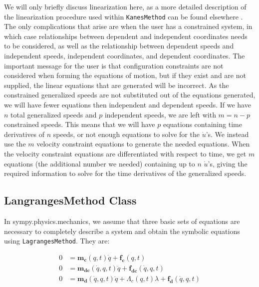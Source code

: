 \documentclass[twocolumn,10pt]{asme2e}
\begin{document}
We will only briefly discuss linearization here, as a more detailed description
of the linearization procedure used within \verb|KanesMethod| can be found
elsewhere \cite{Peterson2013}.  The only complications that arise are when the
user has a constrained system, in which case relationships between dependent
and independent coordinates needs to be considered, as well as the relationship
between dependent speeds and independent speeds, independent coordinates, and
dependent coordinates.  The important message for the user is that
configuration constraints are not considered when forming the equations of
motion, but if they exist and are not supplied, the linear equations that are
generated will be incorrect.
As the constrained generalized speeds are not substituted out of the equations
generated, we will have fewer equations then independent and dependent speeds.
If we have $n$ total generalized speeds and $p$ independent speeds, we are left
with $m=n-p$ constrained speeds.
This means that we will have $p$ equations containing time derivatives of $n$
speeds, or not enough equations to solve for the $\dot{u}$'s.
We instead use the $m$ velocity constraint equations to generate the needed
equations.
When the velocity constraint equations are differentiated with respect to time,
we get $m$ equations (the additional number we needed) containing up to $n$
$\dot{u}$'s, giving the required information to solve for the time derivatives
of the generalized speeds.
\subsection*{LangrangesMethod Class}
In sympy.physics.mechanics, we assume that three basic sets of equations are
necessary to completely describe a system and obtain the symbolic equations
using \verb|LagrangesMethod|. They are:

\begin{align}
    0 &= \mathbf{m_{c}}(q, t) \dot{q} + \mathbf{f_{c}}(q, t) \label{eqn:lag_qd}\\
    0 &= \mathbf{m_{dc}}(\dot{q}, q, t) \ddot{q} + \mathbf{f_{dc}}(\dot{q}, q,
        t) \label{eqn:lag_qdd}\\
    0 &= \mathbf{m_d}(\dot{q}, q, t) \ddot{q} + \Lambda_c(q, t)
        \lambda + \mathbf{f_d}(\dot{q}, q, t) \label{eqn:lag_eom}
\end{align}
\end{document}
